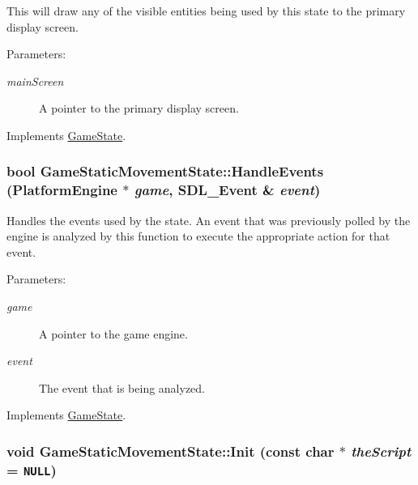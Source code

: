 This will draw any of the visible entities being used by this state to the primary display screen.

\begin{Desc}
\item[Parameters:]
\begin{description}
\item[{\em mainScreen}]A pointer to the primary display screen. \end{description}
\end{Desc}


Implements \hyperlink{class_game_state_1b93233932defca939eed4c0676a5d2a}{GameState}.\hypertarget{class_game_static_movement_state_c73d6f93fee2ac6cb2788eb2984bb305}{
\subsubsection[{HandleEvents}]{\setlength{\rightskip}{0pt plus 5cm}bool GameStaticMovementState::HandleEvents ({\bf PlatformEngine} $\ast$ {\em game}, \/  SDL\_\-Event \& {\em event})}}
\label{d7/d3b/class_game_static_movement_state_c73d6f93fee2ac6cb2788eb2984bb305}


Handles the events used by the state. An event that was previously polled by the engine is analyzed by this function to execute the appropriate action for that event.

\begin{Desc}
\item[Parameters:]
\begin{description}
\item[{\em game}]A pointer to the game engine. \item[{\em event}]The event that is being analyzed. \end{description}
\end{Desc}


Implements \hyperlink{class_game_state_de7bd9bda91253614322ca0ea77b7a14}{GameState}.\hypertarget{class_game_static_movement_state_4cb4be5ea96a6bb7b06c79bed64c355d}{
\subsubsection[{Init}]{\setlength{\rightskip}{0pt plus 5cm}void GameStaticMovementState::Init (const char $\ast$ {\em theScript} = {\tt NULL})}}
\label{d7/d3b/class_game_static_movement_state_4cb4be5ea96a6bb7b06c79bed64c355d}


